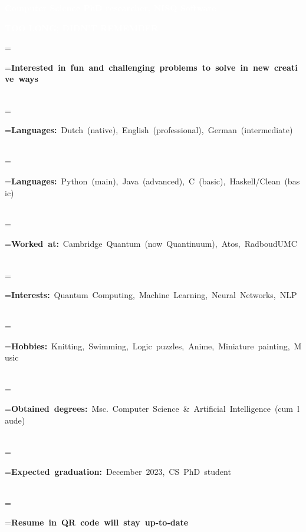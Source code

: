\documentclass[8pt]{article}
\newcommand*{\vcenteredhbox}[1]{\begingroup
\setbox0=\hbox{#1}\parbox{\wd0}{\box0}\endgroup}
\newcommand{\icons}{svg/}	%
\newcommand{\icon}[2]{\colorbox{secondcol}{}}	%
\newcommand{\icontext}[4]{ 						%
	\vcenteredhbox{\icon{#1}{#2}}\hspace{#4} \vcenteredhbox{\textcolor{textcol}{#3}}
}
\begin{document}
\begin{center}
\hspace{-6pt}
	\colorbox{thirdcol}{\hspace{15pt}\small{\textcolor{white}{\textbf{Computer Science PhD researcher, NISQ Software}}\hspace{9pt}}}
\end{center}
\newpage
        \begin{center}
            \colorbox{maincol}{\textcolor{white}{\hspace{9pt}\uppercase{\textbf{Too long; Didn't Remember}}\hspace{9pt}}}
        \end{center}
        \ssmall
        \begin{flushleft}
            \vspace{-5pt}
            \icontext{}{5pt}{\textcolor{fourthcol}{\textbf{Interested in fun and challenging problems to solve in new creative ways}}}{3pt}\\[1pt]
            \icontext{}{5pt}{\textcolor{fourthcol}{\textbf{Languages:}} Dutch (native), English (professional), German (intermediate)}{3pt}\\[1pt]
            \icontext{}{5pt}{\textcolor{fourthcol}{\textbf{Languages:}} Python (main), Java (advanced), C (basic), Haskell/Clean (basic)}{3pt}\\[1pt]
            \icontext{}{5pt}{\textcolor{fourthcol}{\textbf{Worked at:}} Cambridge Quantum (now Quantinuum), Atos, RadboudUMC}{3pt}\\[1pt]
            \icontext{}{5pt}{\textcolor{fourthcol}{\textbf{Interests:}} Quantum Computing, Machine Learning, Neural Networks, NLP}{3pt}\\[1pt]
            \icontext{}{5pt}{\textcolor{fourthcol}{\textbf{Hobbies:}} Knitting, Swimming, Logic puzzles, Anime, Miniature painting, Music}{3pt}\\[1pt]
            \icontext{}{5pt}{\textcolor{fourthcol}{\textbf{Obtained degrees:}} Msc. Computer Science \& Artificial Intelligence (cum laude)}{3pt}\\[1pt]
            \icontext{}{5pt}{\textcolor{fourthcol}{\textbf{Expected graduation:}} December 2023, CS PhD student}{3pt}\\[1pt]
            \icontext{}{5pt}{\textcolor{fourthcol}{\textbf{Resume in QR code will stay up-to-date}} }{3pt}
        \end{flushleft}
\end{document}
